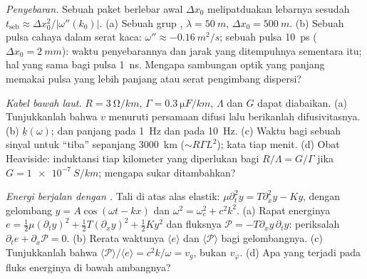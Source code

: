 \begin{exercise}[$\star\star$]\label{exo:b2:dispersion-wave-packets:8}
\emph{Penyebaran.} Sebuah paket berlebar awal $\Delta x_0$ melipatduakan lebarnya
sesudah $t_{\text{seb}} \approx \Delta x_0^2/|\omega''(k_0)|$. (a) Sebuah grup , $\lambda = \qty{50}{m}$, $\Delta x_0 = \qty{500}{m}$. (b) Sebuah pulsa cahaya dalam
serat kaca: $\omega'' \approx \qty{-0.16}{m^2/s}$; sebuah pulsa \qty{10}{ps} ($\Delta x_0 =
\qty{2}{mm}$): waktu penyebarannya dan jarak yang ditempuhnya sementara itu; hal yang sama
bagi pulsa \qty{1}{ns}. Mengapa sambungan optik yang panjang memakai pulsa yang lebih panjang atau
serat pengimbang dispersi?
\end{exercise}

\begin{exercise}[$\star\star$]\label{exo:b2:dispersion-wave-packets:9}
\emph{Kabel bawah laut.} $R = \qty{3}{\ohm/km}$, $\Gamma = \qty{0.3}{\micro F/km}$,
$\Lambda$ dan $G$ dapat diabaikan. (a) Tunjukkanlah bahwa $v$ menuruti persamaan difusi lalu
berikanlah difusivitasnya. (b)  $\underline k(\omega)$;  dan panjang  pada \qty{1}{Hz} dan pada \qty{10}{Hz}. (c)
Waktu bagi sebuah sinyal untuk ``tiba'' sepanjang \qty{3000}{km} ($\sim R\Gamma L^2$); kata tiap
menit. (d) Obat Heaviside: induktansi tiap kilometer yang diperlukan bagi
$R/\Lambda = G/\Gamma$ jika $G = \qty{1e-7}{S/km}$; mengapa sukar ditambahkan?
\end{exercise}

\begin{exercise}[$\star\star\star$]\label{exo:b2:dispersion-wave-packets:10}
\emph{Energi berjalan dengan .} Tali di atas alas elastik:
$\mu\partial_t^2y = T\partial_x^2y - Ky$, dengan gelombang $y = A\cos(\omega t - kx)$ dan $\omega^2 =
\omega_c^2 + c^2k^2$. (a) Rapat energinya $e = \tfrac12\mu(\partial_ty)^2 + \tfrac12T
(\partial_xy)^2 + \tfrac12Ky^2$ dan fluksnya $\mathcal P = -T\partial_xy\,\partial_ty$: periksalah
$\partial_te + \partial_x\mathcal P = 0$. (b) Rerata waktunya $\langle e\rangle$ dan
$\langle\mathcal P\rangle$ bagi gelombangnya. (c) Tunjukkanlah bahwa $\langle\mathcal P\rangle/
\langle e\rangle = c^2k/\omega = v_g$, bukan $v_\varphi$. (d) Apa yang terjadi pada
fluks energinya di bawah ambangnya?
\end{exercise}

